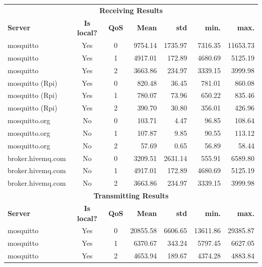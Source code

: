 \begin{table}
	\centering
	\begin{tabular}{lccrrrr}
		\toprule
		\multicolumn{7}{c}{\textbf{Receiving Results}}\\
		\textbf{Server} & \textbf{Is local?} & \textbf{QoS} & \textbf{Mean} & \textbf{std} & \textbf{min.} & \textbf{max.}\\
		\toprule
		mosquitto         & Yes     &0    & 9754.14        &1735.97 &7316.35 &11653.73  \\
		mosquitto         & Yes     &1    & 4917.01        &172.89  &4680.69 & 5125.19  \\
		mosquitto         & Yes     &2    & 3663.86        &234.97  &3339.15 & 3999.98  \\
		\midrule
		mosquitto (Rpi)   & Yes     &0    & 820.48         &36.45   &781.01  & 860.08   \\
		mosquitto (Rpi)   & Yes     &1    & 780.07         &73.96   &650.22  & 835.46   \\
		mosquitto (Rpi)   & Yes     &2    & 390.70         &30.80   &356.01  & 426.96   \\
		\midrule
		mosquitto.org     & No      &0    & 103.71         & 4.47   & 96.85  & 108.64   \\
		mosquitto.org     & No      &1    & 107.87         & 9.85   & 90.55  & 113.12   \\
		mosquitto.org     & No      &2    & 57.69          & 0.65   & 56.89  & 58.44    \\
		\midrule
		broker.hivemq.com & No      &0    & 3209.51        & 2631.14& 555.91 & 6589.80  \\
		broker.hivemq.com & No      &1    & 4917.01        &172.89  &4680.69 & 5125.19  \\
		broker.hivemq.com & No      &2    & 3663.86        &234.97  &3339.15 & 3999.98  \\
		\toprule
		\multicolumn{7}{c}{\textbf{Transmitting Results}}\\
		\textbf{Server} & \textbf{Is local?} & \textbf{QoS} & \textbf{Mean} & \textbf{std} & \textbf{min.} & \textbf{max.}\\
		\toprule
		mosquitto         & Yes     &0    & 20855.58          &6606.65 &13611.86  &29385.87  \\
		mosquitto         & Yes     &1    & 6370.67           &343.24  &5797.45   &6627.05   \\
		mosquitto         & Yes     &2    & 4653.94           &189.67  &4374.28   &4883.84   \\

\end{tabular}
\end{table}
